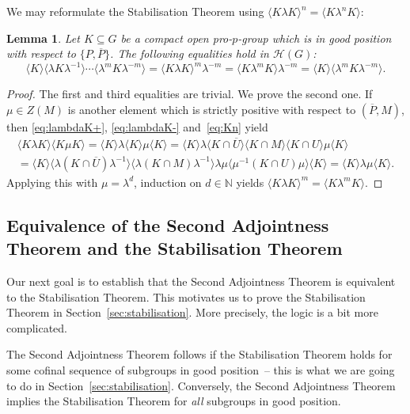 \documentclass{amsart}
\newtheorem{lem}[theorem]{Lemma}
\theoremstyle{remark}
\theoremstyle{definition}
\newcommand*{\idem}[1]{\langle#1\rangle}%
\newcommand*{\opp}[1]{\overline{#1}}%
\newcommand*{\N}{\mathbb N}%
\newcommand*{\Hecke}{\mathcal H}%
\begin{document}
We may reformulate the Stabilisation Theorem using \(\idem{K\lambda K}^n = \idem{K\lambda^n K}\):

\begin{lem}
  \label{lem:1}
  Let \(K \subseteq G\) be a compact open pro-\(p\)-group which is in good position with respect to \(\{P,\opp{P}\}\).  The following equalities hold in \(\Hecke(G)\):
  \[
  \idem{K} \idem{\lambda K \lambda^{-1}} \dotsm \idem{\lambda^m K \lambda^{-m}}
  = \idem{K \lambda K}^m \lambda^{-m}
  = \idem{K \lambda^m K} \lambda^{-m}
  = \idem{K} \idem{\lambda^m K \lambda^{-m}}.
  \]
\end{lem}

\begin{proof}
  The first and third equalities are trivial.  We prove the second one.  If \(\mu \in Z(M)\) is another element which is strictly positive with respect to \((\opp{P},M)\), then \eqref{eq:lambdaK+}, \eqref{eq:lambdaK-} and~\eqref{eq:Kn} yield
  \begin{multline*}
    \idem{K \lambda K} \idem{K \mu K}
    = \idem{K} \lambda \idem{K} \mu \idem{K}
    = \idem{K} \lambda \idem{K \cap \opp{U}} \idem{K \cap M} \idem{K \cap U} \mu \idem{K}\\
    = \idem{K} \idem{\lambda (K \cap \opp{U}) \lambda^{-1}}
    \idem{\lambda (K \cap M) \lambda^{-1}} \lambda \mu \idem{\mu^{-1} (K \cap U) \mu} \idem{K}
    = \idem{K} \lambda \mu \idem{K}.
  \end{multline*}
  Applying this with \(\mu = \lambda^d\), induction on \(d\in\N\) yields \(\idem{K \lambda K}^m = \idem{K \lambda^m K}\).
\end{proof}


\subsection{Equivalence of the Second Adjointness Theorem and the Stabilisation Theorem}
\label{sec:adjointness_versus_stabilisation}

Our next goal is to establish that the Second Adjointness Theorem is equivalent to the Stabilisation Theorem.  This motivates us to prove the Stabilisation Theorem in Section~\ref{sec:stabilisation}.  More precisely, the logic is a bit more complicated.

The Second Adjointness Theorem follows if the Stabilisation Theorem holds for some cofinal sequence of subgroups in good position~-- this is what we are going to do in Section~\ref{sec:stabilisation}.  Conversely, the Second Adjointness Theorem implies the Stabilisation Theorem for \emph{all} subgroups in good position.
\end{document}
